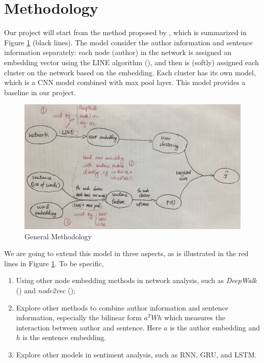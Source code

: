 
\section{Methodology}
\label{Sec:methodology}


Our project will start from the method proposed by \cite{yang2017attention}, which is summarized in Figure \ref{Fig:Flow} (black lines). The model consider the author information and sentence information separately: each node (author) in the network is assigned an embedding vector using the LINE algorithm (\cite{tang2015line}), and then is (softly) assigned each cluster on the network based on the embedding. Each cluster has its own model, which is a CNN model combined with max pool layer. This model provides a baseline in our project.

\begin{figure}[htbp] %
   \centering
   \includegraphics[width=5.2in]{flow.jpg} 
   \caption{General Methodology}
   \label{Fig:Flow}
\end{figure}



We are going to extend this model in three aspects, as is illustrated in the red lines in Figure \ref{Fig:Flow}. To be specific, 
\begin{enumerate}   [(1)]
\item Using other node embedding methods in network analysis, such as \textit{DeepWalk} (\cite{perozzi2014deepwalk}) and \textit{node2vec} (\cite{grover2016node2vec});
\item Explore other methods to combine author information and sentence information, especially the bilinear form $a^T W h$ which measures the interaction between author and sentence. Here $a$ is the author embedding and $h$ is the sentence embedding.
\item Explore other models in sentiment analysis, such as RNN, GRU, and LSTM.
\end{enumerate}
